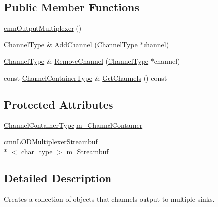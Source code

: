 \subsection*{Public Member Functions}
\begin{DoxyCompactItemize}
\item 
\hyperlink{classcmn_output_multiplexer_ae508d920a59799588a6bcd87a5e33f50}{cmn\-Output\-Multiplexer} ()
\item 
\hyperlink{classcmn_output_multiplexer_abebdbc4cebf9eeb2ce4159f2c649968e}{Channel\-Type} \& \hyperlink{classcmn_output_multiplexer_a70d534895f21217e1e7e75e837fc65e7}{Add\-Channel} (\hyperlink{classcmn_output_multiplexer_abebdbc4cebf9eeb2ce4159f2c649968e}{Channel\-Type} $\ast$channel)
\item 
\hyperlink{classcmn_output_multiplexer_abebdbc4cebf9eeb2ce4159f2c649968e}{Channel\-Type} \& \hyperlink{classcmn_output_multiplexer_acd5d9cf95e534975f63dc4a61bd54b84}{Remove\-Channel} (\hyperlink{classcmn_output_multiplexer_abebdbc4cebf9eeb2ce4159f2c649968e}{Channel\-Type} $\ast$channel)
\item 
const \hyperlink{classcmn_output_multiplexer_aca2d6dc567cf721a0dbb2f887c175b7b}{Channel\-Container\-Type} \& \hyperlink{classcmn_output_multiplexer_a9720bcf8e2380b30373fbd1ad329f639}{Get\-Channels} () const 
\end{DoxyCompactItemize}
\subsection*{Protected Attributes}
\begin{DoxyCompactItemize}
\item 
\hyperlink{classcmn_output_multiplexer_aca2d6dc567cf721a0dbb2f887c175b7b}{Channel\-Container\-Type} \hyperlink{classcmn_output_multiplexer_a2bbdcfbb9a7395c5538432523ade4b1a}{m\-\_\-\-Channel\-Container}
\item 
\hyperlink{classcmn_l_o_d_multiplexer_streambuf}{cmn\-L\-O\-D\-Multiplexer\-Streambuf}\\*
$<$ \hyperlink{classcmn_output_multiplexer_aa35542dd7f4e6d55780bc7ed741910fe}{char\-\_\-type} $>$ \hyperlink{classcmn_output_multiplexer_a64c336dbeee16f5d94503c2a4265b97c}{m\-\_\-\-Streambuf}
\end{DoxyCompactItemize}


\subsection{Detailed Description}
Creates a collection of objects that channels output to multiple sinks. 

